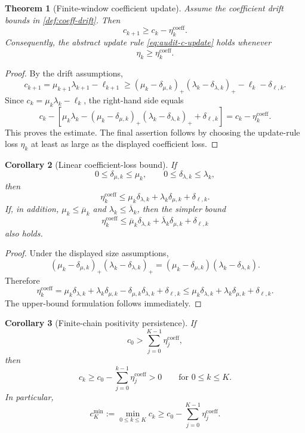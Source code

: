 \documentclass[11pt]{article}
\numberwithin{equation}{section}
\theoremstyle{plain}
\newtheorem{theorem}{Theorem}[section]
\newtheorem{corollary}[theorem]{Corollary}
\theoremstyle{definition}
\theoremstyle{remark}
\begin{document}
\begin{theorem}[Finite-window coefficient update]\label{thm:coeff-update}
Assume the coefficient drift bounds in \cref{def:coeff-drift}.  Then
\[
  c_{k+1}\ge c_k-\eta_k^{\mathrm{coeff}}.
\]
Consequently, the abstract update rule \eqref{eq:audit-c-update} holds whenever
\[
  \eta_k\ge\eta_k^{\mathrm{coeff}}.
\]
\end{theorem}

\begin{proof}
By the drift assumptions,
\[
  c_{k+1}
  =
  \mu_{k+1}\lambda_{k+1}-\ell_{k+1}
  \ge
  (\mu_k-\delta_{\mu,k})_+
  (\lambda_k-\delta_{\lambda,k})_+
  -
  \ell_k-\delta_{\ell,k}.
\]
Since \(c_k=\mu_k\lambda_k-\ell_k\), the right-hand side equals
\[
  c_k
  -
  \left[
    \mu_k\lambda_k
    -
    (\mu_k-\delta_{\mu,k})_+
    (\lambda_k-\delta_{\lambda,k})_+
    +
    \delta_{\ell,k}
  \right]
  =
  c_k-\eta_k^{\mathrm{coeff}}.
\]
This proves the estimate.  The final assertion follows by choosing the
update-rule loss \(\eta_k\) at least as large as the displayed coefficient
loss.
\end{proof}

\begin{corollary}[Linear coefficient-loss bound]\label{cor:linear-coeff-loss}
If
\[
  0\le\delta_{\mu,k}\le\mu_k,
  \qquad
  0\le\delta_{\lambda,k}\le\lambda_k,
\]
then
\[
  \eta_k^{\mathrm{coeff}}
  \le
  \mu_k\delta_{\lambda,k}
  +
  \lambda_k\delta_{\mu,k}
  +
  \delta_{\ell,k}.
\]
If, in addition, \(\mu_k\le\overline\mu_k\) and
\(\lambda_k\le\overline\lambda_k\), then the simpler bound
\[
  \eta_k^{\mathrm{coeff}}
  \le
  \overline\mu_k\delta_{\lambda,k}
  +
  \overline\lambda_k\delta_{\mu,k}
  +
  \delta_{\ell,k}
\]
also holds.
\end{corollary}

\begin{proof}
Under the displayed size assumptions,
\[
  (\mu_k-\delta_{\mu,k})_+
  (\lambda_k-\delta_{\lambda,k})_+
  =
  (\mu_k-\delta_{\mu,k})(\lambda_k-\delta_{\lambda,k}).
\]
Therefore
\[
  \eta_k^{\mathrm{coeff}}
  =
  \mu_k\delta_{\lambda,k}
  +
  \lambda_k\delta_{\mu,k}
  -
  \delta_{\mu,k}\delta_{\lambda,k}
  +
  \delta_{\ell,k}
  \le
  \mu_k\delta_{\lambda,k}
  +
  \lambda_k\delta_{\mu,k}
  +
  \delta_{\ell,k}.
\]
The upper-bound formulation follows immediately.
\end{proof}

\begin{corollary}[Finite-chain positivity persistence]\label{cor:coeff-positivity}
If
\[
  c_0>\sum_{j=0}^{K-1}\eta_j^{\mathrm{coeff}},
\]
then
\[
  c_k
  \ge
  c_0-\sum_{j=0}^{k-1}\eta_j^{\mathrm{coeff}}>0
  \qquad\text{for }0\le k\le K.
\]
In particular,
\[
  c_K^{\min}
  :=
  \min_{0\le k\le K}c_k
  \ge
  c_0-\sum_{j=0}^{K-1}\eta_j^{\mathrm{coeff}}.
\]
\end{corollary}
\end{document}

